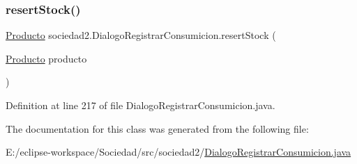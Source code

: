 \subsubsection{\texorpdfstring{resert\+Stock()}{resertStock()}}
{\footnotesize\ttfamily \mbox{\hyperlink{classsociedad2_1_1_producto}{Producto}} sociedad2.\+Dialogo\+Registrar\+Consumicion.\+resert\+Stock (\begin{DoxyParamCaption}\item[{\mbox{\hyperlink{classsociedad2_1_1_producto}{Producto}}}]{producto }\end{DoxyParamCaption})}



Definition at line 217 of file Dialogo\+Registrar\+Consumicion.\+java.



The documentation for this class was generated from the following file\+:\begin{DoxyCompactItemize}
\item 
E\+:/eclipse-\/workspace/\+Sociedad/src/sociedad2/\mbox{\hyperlink{_dialogo_registrar_consumicion_8java}{Dialogo\+Registrar\+Consumicion.\+java}}\end{DoxyCompactItemize}
